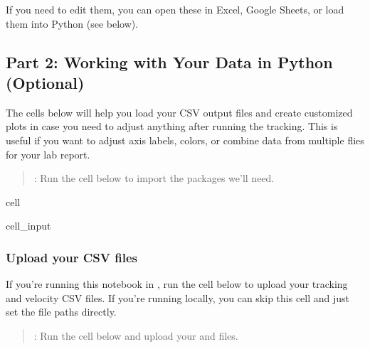 \documentclass[letterpaper,10pt,english]{jupyterBook}
\begin{document}
\sphinxAtStartPar
If you need to edit them, you can open these in Excel, Google Sheets, or load them into Python (see below).




\subsection{Part 2: Working with Your Data in Python (Optional)}
\label{\detokenize{FlyTracking/Script:part-2-working-with-your-data-in-python-optional}}
\sphinxAtStartPar
The cells below will help you load your CSV output files and create customized plots in case you need to adjust anything after running the tracking. This is useful if you want to adjust axis labels, colors, or combine data from multiple flies for your lab report.
\begin{quote}

\sphinxAtStartPar
{}: Run the cell below to import the packages we’ll need.
\end{quote}

\begin{sphinxuseclass}{cell}\begin{sphinxVerbatimInput}

\begin{sphinxuseclass}{cell_input}
\begin{sphinxVerbatim}[commandchars=\\\{\}]
 

\end{sphinxVerbatim}

\end{sphinxuseclass}\end{sphinxVerbatimInput}

\end{sphinxuseclass}

\subsubsection{Upload your CSV files}
\label{\detokenize{FlyTracking/Script:upload-your-csv-files}}
\sphinxAtStartPar
If you’re running this notebook in , run the cell below to upload your tracking and velocity CSV files. If you’re running locally, you can skip this cell and just set the file paths directly.
\begin{quote}

\sphinxAtStartPar
{}: Run the cell below and upload your  and  files.
\end{quote}
\end{document}
